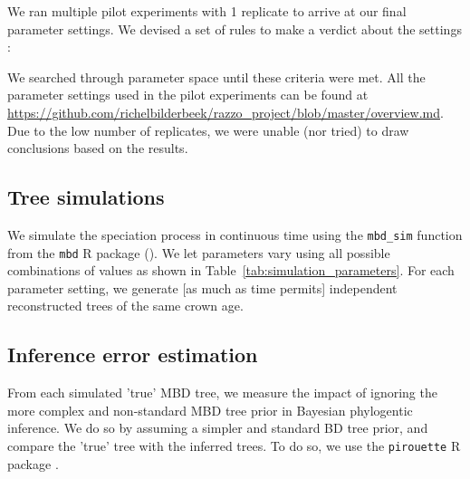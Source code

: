 We ran multiple pilot experiments with 1 replicate to arrive at our final
parameter settings. We devised a set of rules to make a verdict about the
settings :

We searched through parameter space until these criteria were met.
All the parameter settings used in the pilot experiments can be found at 
\url{https://github.com/richelbilderbeek/razzo_project/blob/master/overview.md}.
Due to the low number of replicates, we were unable (nor tried)
to draw conclusions based on the results. 

\subsection{Tree simulations}

We simulate the speciation process in continuous time 
using the \verb;mbd_sim; function from the \verb;mbd; R package (\citep{mbd}).
We let parameters vary using all possible combinations of values 
as shown in Table~\ref{tab:simulation_parameters}.
For each parameter setting, 
we generate [as much as time permits] 
independent reconstructed trees of the same crown age.

\subsection{Inference error estimation}

From each simulated 'true' MBD tree, we measure the impact of
ignoring the more complex and non-standard MBD tree prior in
Bayesian phylogentic inference.
We do so by assuming a simpler and standard BD tree prior,
and compare the 'true' tree with the inferred trees.
To do so, we use the \verb;pirouette; R package \citep{pirouette}.

